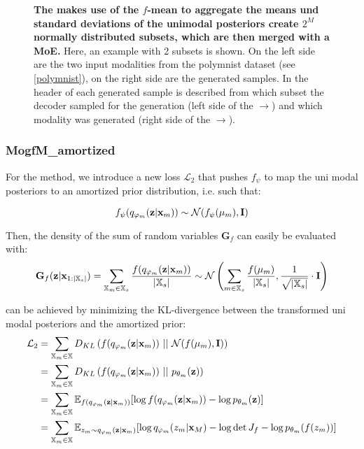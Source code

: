 \begin{figure}[h!]
    \centering
    \caption{\textbf{The  makes use of the $f$-mean to aggregate the means und standard deviations of the unimodal posteriors create $2^M$ normally distributed subsets, which are then merged with a MoE.} Here, an example with 2 subsets is shown. On the left side are the two input modalities from the polymnist dataset (see \cref{polymnist}), on the right side are the generated samples. In the header of each generated sample is described from which subset the decoder sampled for the generation (left side of the $\rightarrow$) and which modality was generated (right side of the $\rightarrow$).}
    \label{fig:mopgfm}
\end{figure}

\subsubsection{MogfM\_amortized}\label{subsubsec:mogfm_amortized}
For the  method, we introduce a new loss $\mathcal{L}_2$ that pushes $f_{\psi}$ to map the uni modal posteriors to an amortized prior distribution, i.e. such that:

\begin{equation}
    \label{eq:amortizedprior}
    f_{\psi}(q_{\varphi_m}(\textbf{z}|\textbf{x}_m)) \sim \mathcal{N}(f_{\psi}(\mu_m), \textbf{I})
\end{equation}

Then, the density of the sum of random variables $\textbf{G}_f$ can easily be evaluated with:
\begin{equation}
    \textbf{G}_f(\textbf{z}|\textbf{x}_{1:|\mathbb{X}_s|}) =\sum _{\mathbb{X}_m \in \mathbb{X}_s} \frac{f(q_{\varphi_m}(\textbf{z}|\textbf{x}_m))}{|\mathbb{X}_s|} \sim \mathcal{N} \left(  \sum _{m \in \mathbb{X}_s} \frac{f(\mu_m)}{|\mathbb{X}_s|}, \frac{1}{\sqrt{|\mathbb{X}_s|}}  \cdot \textbf{I} \right)
\end{equation}

 can be achieved by minimizing the KL-divergence between the transformed uni modal posteriors and the amortized prior:
\begin{equation}
    \begin{split}
        \mathcal{L}_2 &= \sum _{\xsetm \in \xset} D_{KL}\left( f(\unimodalpost)\ ||\ \mathcal{N}(f(\mu_m), \textbf{I}) \right)\\
        &= \sum _{\xsetm \in \xset} D_{KL}\left( f(\unimodalpost)\ ||\ p_{\theta_m}(\textbf{z}) \right)\\
        &=  \sum _{\xsetm \in \xset} \mathbb{E}_{f(\unimodalpost)} [\log f(\unimodalpost) - \log p_{\theta_m}(\textbf{z})]\\
        &=  \sum _{\xsetm \in \xset} \mathbb{E}_{z_m \sim \unimodalpost} [\log q_{\phi_m}(z_m|\textbf{x}_M) - \log \det J_f  - \log p_{\theta_m}(f(z_m))]\\
    \end{split}
\end{equation}

